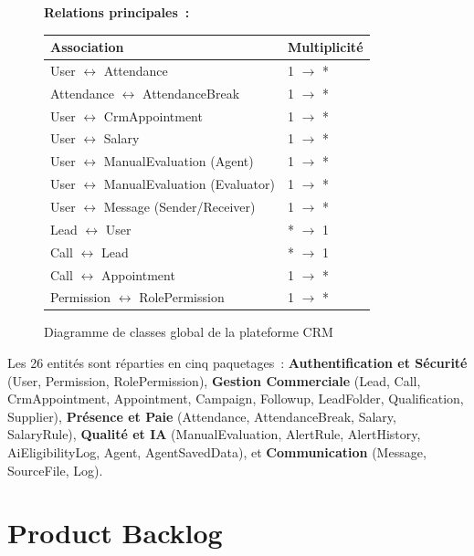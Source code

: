 \begin{figure}[H]
{{    \vspace{0.3cm}
    \textbf{Relations principales~:}\\[0.1cm]
    \begin{tabular}{@{}ll@{}}
    \hline
    \textbf{Association} & \textbf{Multiplicité} \\
    \hline
    User $\longleftrightarrow$ Attendance & 1 $\longrightarrow$ * \\
    Attendance $\longleftrightarrow$ AttendanceBreak & 1 $\longrightarrow$ * \\
    User $\longleftrightarrow$ CrmAppointment & 1 $\longrightarrow$ * \\
    User $\longleftrightarrow$ Salary & 1 $\longrightarrow$ * \\
    User $\longleftrightarrow$ ManualEvaluation (Agent) & 1 $\longrightarrow$ * \\
    User $\longleftrightarrow$ ManualEvaluation (Evaluator) & 1 $\longrightarrow$ * \\
    User $\longleftrightarrow$ Message (Sender/Receiver) & 1 $\longrightarrow$ * \\
    Lead $\longleftrightarrow$ User & * $\longrightarrow$ 1 \\
    Call $\longleftrightarrow$ Lead & * $\longrightarrow$ 1 \\
    Call $\longleftrightarrow$ Appointment & 1 $\longrightarrow$ * \\
    Permission $\longleftrightarrow$ RolePermission & 1 $\longrightarrow$ * \\
    \hline
    \end{tabular}
    \vspace{0.3cm}
    }}
    \caption{Diagramme de classes global de la plateforme CRM}
    \label{fig:class_diagram}
\end{figure}

Les 26 entités sont réparties en cinq paquetages~: \textbf{Authentification et Sécurité}
(User, Permission, RolePermission), \textbf{Gestion Commerciale} (Lead, Call, CrmAppointment,
Appointment, Campaign, Followup, LeadFolder, Qualification, Supplier),
\textbf{Présence et Paie} (Attendance, AttendanceBreak, Salary, SalaryRule),
\textbf{Qualité et IA} (ManualEvaluation, AlertRule, AlertHistory, AiEligibilityLog, Agent,
AgentSavedData), et \textbf{Communication} (Message, SourceFile, Log).

\section{Product Backlog}
\label{sec:product_backlog}

